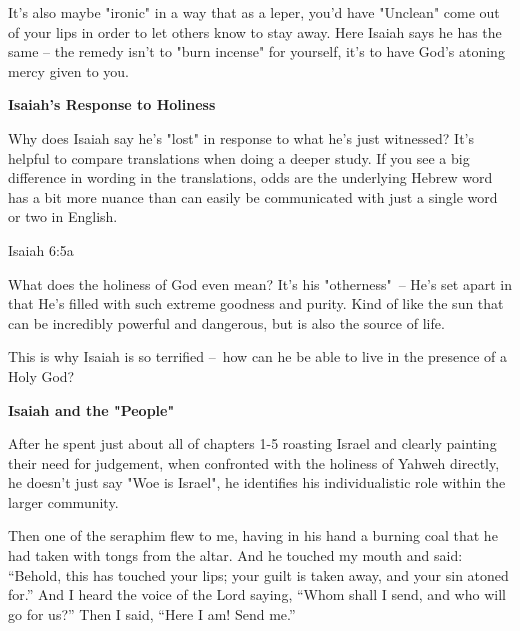 \documentclass[11pt]{article}
\begin{document}
{\vspace{1em}}
It's also maybe "ironic" in a way that as a leper, you'd have "Unclean" come out of your lips in order to let others know to stay away. Here Isaiah says he has the same – the remedy isn't to "burn incense" for yourself, it's to have God's atoning mercy given to you.

{\vspace{3em}}
{\large\bfseries Isaiah's Response to Holiness}
{\vspace{1em}}

Why does Isaiah say he's "lost" in response to what he's just witnessed? It's helpful to compare translations when doing a deeper study.
If you see a big difference in wording in the translations, odds are the underlying Hebrew word has a bit more nuance than can easily be communicated with just a single word or two in English.
\begin{biblecomparison}{Isaiah 6:5a}
\end{biblecomparison}


What does the holiness of God even mean? It's his "otherness" – He's set apart in that He's filled with such extreme goodness and purity. Kind of like the sun that can be incredibly powerful and dangerous, but is also the source of life.

This is why Isaiah is so terrified – how can he be able to live in the presence of a Holy God?

{\vspace{3em}}
{\large\bfseries Isaiah and the "People"}
{\vspace{1em}}

After he spent just about all of chapters 1-5 roasting Israel and clearly painting their need for judgement, when confronted with the holiness of Yahweh directly, he doesn't just say "Woe is Israel", he identifies his individualistic role within the larger community.


\begin{biblicaloutline}[Isaiah 6:6-8]
    
         Then one of the seraphim flew to me, having in his hand a burning coal that he had taken with tongs from the altar.
         And he touched my mouth and said: ``Behold, this has touched your lips; your guilt is taken away, and your sin atoned for.''
          And I heard the voice of the Lord saying, ``Whom shall I send, and who will go for us?'' Then I said, ``Here I am! Send me.''

\end{biblicaloutline}
\end{document}
